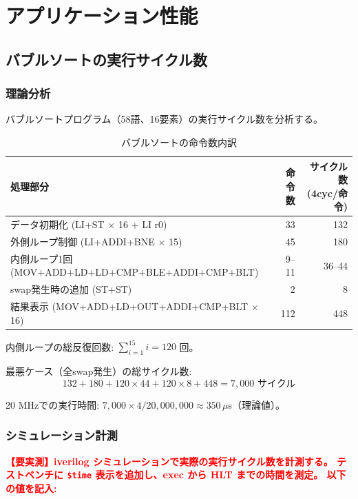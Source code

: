 \documentclass[a4paper,11pt]{ltjsarticle}
\newcommand{\measured}[1]{\textcolor{red}{\textbf{【要実測】#1}}}
\begin{document}
\section{アプリケーション性能}

\subsection{バブルソートの実行サイクル数}

\subsubsection{理論分析}

バブルソートプログラム（58語、16要素）の実行サイクル数を分析する。

\begin{table}[h]
\centering
\caption{バブルソートの命令数内訳}
\begin{tabular}{lrr}
\toprule
処理部分 & 命令数 & サイクル数 (4cyc/命令) \\
\midrule
データ初期化 (LI+ST $\times$ 16 + LI r0) & 33 & 132 \\
外側ループ制御 (LI+ADDI+BNE $\times$ 15) & 45 & 180 \\
内側ループ1回 (MOV+ADD+LD+LD+CMP+BLE+ADDI+CMP+BLT) & 9--11 & 36--44 \\
swap発生時の追加 (ST+ST) & 2 & 8 \\
結果表示 (MOV+ADD+LD+OUT+ADDI+CMP+BLT $\times$ 16) & 112 & 448 \\
\bottomrule
\end{tabular}
\end{table}

内側ループの総反復回数: $\sum_{i=1}^{15} i = 120$ 回。

最悪ケース（全swap発生）の総サイクル数:
\[
132 + 180 + 120 \times 44 + 120 \times 8 + 448 = 7{,}000 \text{ サイクル}
\]

20 MHzでの実行時間: $7{,}000 \times 4 / 20{,}000{,}000 \approx 350\,\mu$s（理論値）。

\subsubsection{シミュレーション計測}

\measured{iverilog シミュレーションで実際の実行サイクル数を計測する。
テストベンチに \texttt{\$time} 表示を追加し、exec から HLT までの時間を測定。
以下の値を記入:}
\end{document}
